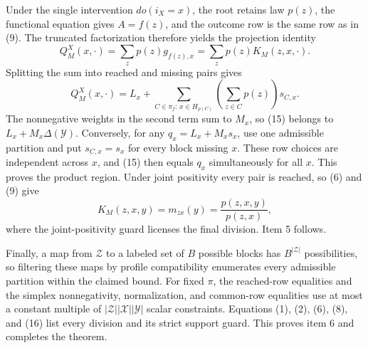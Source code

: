 Under the single intervention \(do(i_X=x)\), the root retains law
\(p(z)\), the functional equation gives \(A=f(z)\), and the outcome row is
the same row as in (9).  The truncated factorization therefore yields the
projection identity
\[
 Q_M^X(x,\cdot)=\sum_zp(z)g_{f(z),x}
               =\sum_zp(z)K_M(z,x,\cdot).
\tag{14}
\]
Splitting the sum into reached and missing pairs gives
\[
 Q_M^X(x,\cdot)
 =L_x+\sum_{C\in\pi_f:\,x\in H_{\rho(C)}}
       \left(\sum_{z\in C}p(z)\right)s_{C,x}.
\tag{15}
\]
The nonnegative weights in the second term sum to \(M_x\), so (15)
belongs to \(L_x+M_x\Delta(\mathcal Y)\).  Conversely, for any
\(q_x=L_x+M_xs_x\), use one admissible partition and put
\(s_{C,x}=s_x\) for every block missing \(x\).  These row choices are
independent across \(x\), and (15) then equals \(q_x\) simultaneously for
all \(x\).  This proves the product region.  Under joint positivity every
pair is reached, so (6) and (9) give
\[
 K_M(z,x,y)=m_{zx}(y)=\frac{p(z,x,y)}{p(z,x)},
\tag{16}
\]
where the joint-positivity guard licenses the final division.  Item 5
follows.

Finally, a map from \(\mathcal Z\) to a labeled set of \(B\) possible
blocks has \(B^{|\mathcal Z|}\) possibilities, so filtering these maps by
profile compatibility enumerates every admissible partition within the
claimed bound.  For fixed \(\pi\), the reached-row equalities and the
simplex nonnegativity, normalization, and common-row equalities use at
most a constant multiple of
\(|\mathcal Z||\mathcal X||\mathcal Y|\) scalar constraints.  Equations
(1), (2), (6), (8), and (16) list every division and its strict support
guard.  This proves item 6 and completes the theorem.